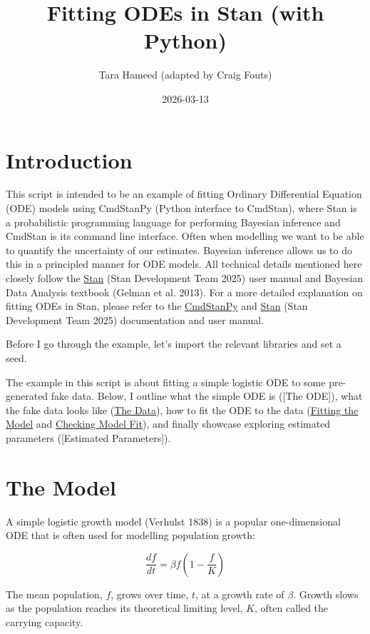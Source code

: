 \documentclass[
  12pt,
]{article}
\title{Fitting ODEs in Stan (with Python)}
\author{Tara Hameed (adapted by Craig Fouts)}
\date{2026-03-13}
\begin{document}
\maketitle

\section{Introduction}\label{introduction}

This script is intended to be an example of fitting Ordinary
Differential Equation (ODE) models using CmdStanPy (Python interface to
CmdStan), where Stan is a probabilistic programming language for
performing Bayesian inference and CmdStan is its command line interface.
Often when modelling we want to be able to quantify the uncertainty of
our estimates. Bayesian inference allows us to do this in a principled
manner for ODE models. All technical details mentioned here closely
follow the \href{https://mc-stan.org/docs/stan-users-guide/}{Stan} (Stan
Development Team 2025) user manual and Bayesian Data Analysis textbook
(Gelman et al. 2013). For a more detailed explanation on fitting ODEs in
Stan, please refer to the
\href{https://mc-stan.org/cmdstanpy/}{CmdStanPy} and
\href{https://mc-stan.org/docs/stan-users-guide/}{Stan} (Stan
Development Team 2025) documentation and user manual.

Before I go through the example, let's import the relevant libraries and
set a seed.

The example in this script is about fitting a simple logistic ODE to
some pre-generated fake data. Below, I outline what the simple ODE is
({[}The ODE{]}), what the fake data looks like (\hyperref[the-data]{The
Data}), how to fit the ODE to the data
(\hyperref[fitting-the-model]{Fitting the Model} and
\hyperref[checking-model-fit]{Checking Model Fit}), and finally showcase
exploring estimated parameters ({[}Estimated Parameters{]}).

\section{The Model}\label{the-model}

A simple logistic growth model (Verhulst 1838) is a popular
one-dimensional ODE that is often used for modelling population growth:

\[
\frac{df}{dt} = \beta f \left( 1 - \frac{f}{K} \right)
\]

The mean population, \(f\), grows over time, \(t\), at a growth rate of
\(\beta\). Growth slows as the population reaches its theoretical
limiting level, \(K\), often called the carrying capacity.
\end{document}
